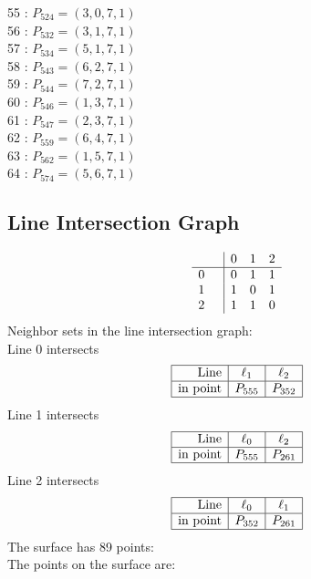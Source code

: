 \documentclass{article}
\begin{document}
{\begin{multicols}{2}
55 : $P_{524}=( 3, 0, 7, 1 )$\\
56 : $P_{532}=( 3, 1, 7, 1 )$\\
57 : $P_{534}=( 5, 1, 7, 1 )$\\
58 : $P_{543}=( 6, 2, 7, 1 )$\\
59 : $P_{544}=( 7, 2, 7, 1 )$\\
60 : $P_{546}=( 1, 3, 7, 1 )$\\
61 : $P_{547}=( 2, 3, 7, 1 )$\\
62 : $P_{559}=( 6, 4, 7, 1 )$\\
63 : $P_{562}=( 1, 5, 7, 1 )$\\
64 : $P_{574}=( 5, 6, 7, 1 )$\\
\end{multicols}
\subsection*{Line Intersection Graph}
{\arraycolsep=1pt
$$
\begin{array}{rr|*{3}r}
 &  & 0 & 1 & 2\\
\hline
0 &  & 0 & 1 & 1\\
1 &  & 1 & 0 & 1\\
2 &  & 1 & 1 & 0\\
\end{array}
$$
}%
Neighbor sets in the line intersection graph:\\
Line 0 intersects 
$$
\begin{array}{|r*{2}{|c}|}
\hline
\mbox{Line}  & \ell_{1} & \ell_{2}\\
\hline
\mbox{in point}  & P_{555} & P_{352}\\
\hline
\end{array}
$$
Line 1 intersects 
$$
\begin{array}{|r*{2}{|c}|}
\hline
\mbox{Line}  & \ell_{0} & \ell_{2}\\
\hline
\mbox{in point}  & P_{555} & P_{261}\\
\hline
\end{array}
$$
Line 2 intersects 
$$
\begin{array}{|r*{2}{|c}|}
\hline
\mbox{Line}  & \ell_{0} & \ell_{1}\\
\hline
\mbox{in point}  & P_{352} & P_{261}\\
\hline
\end{array}
$$
The surface has 89 points:\\
The points on the surface are:\\
\begin{multicols}{3}

\end{multicols}}
\end{document}
